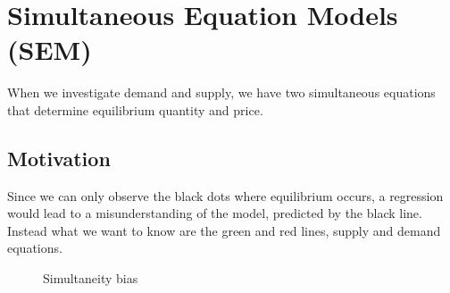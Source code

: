         
    \section{Simultaneous Equation Models (SEM)}

        When we investigate demand and supply, we have two simultaneous equations that determine equilibrium quantity and price.
        
        \subsection{Motivation}
            Since we can only observe the black dots where equilibrium occurs, a regression would lead to a misunderstanding of the model, predicted by the black line. Instead what we want to know are the green and red lines, supply and demand equations.

            \begin{figure}
                \centering
                
                \caption{Simultaneity bias}
                \label{fig:endogeneity/sem}
            \end{figure}

